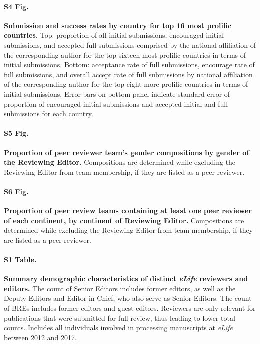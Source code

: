 \documentclass[10pt,letterpaper]{article}
\begin{document}
\paragraph*{S4 Fig.}
\label{S4_Fig}
{\bf Submission and success rates by country for top 16 most prolific countries.} Top: proportion of all initial submissions, encouraged initial submissions, and accepted full submissions comprised by the national affiliation of the corresponding author for the top sixteen most prolific countries in terms of initial submissions. Bottom: acceptance rate of full submissions, encourage rate of full submissions, and overall accept rate of full submissions by national affiliation of the corresponding author for the top eight more prolific countries in terms of initial submissions. Error bars on bottom panel indicate standard error of proportion of encouraged initial submissions and accepted initial and full submissions for each country.

\paragraph*{S5 Fig.}
\label{S5_Fig}
{\bf Proportion of peer reviewer team’s gender compositions by gender of the Reviewing Editor.} Compositions are determined while excluding the Reviewing Editor from team membership, if they are listed as a peer reviewer. 

\paragraph*{S6 Fig.}
\label{S6_Fig}
{\bf Proportion of peer review teams containing at least one peer reviewer of each continent, by continent of Reviewing Editor.}  Compositions are determined while excluding the Reviewing Editor from team membership, if they are listed as a peer reviewer.

\paragraph*{S1 Table.}
\label{S1_Table}
{\bf Summary demographic characteristics of distinct \textit{eLife} reviewers and editors.} The count of Senior Editors includes former editors, as well as the Deputy Editors and Editor-in-Chief, who also serve as Senior Editors. The count of BREs includes former editors and guest editors. Reviewers are only relevant for publications that were submitted for full review, thus leading to lower total counts. Includes all individuals involved in processing manuscripts at \textit{eLife} between 2012 and 2017.
\end{document}

